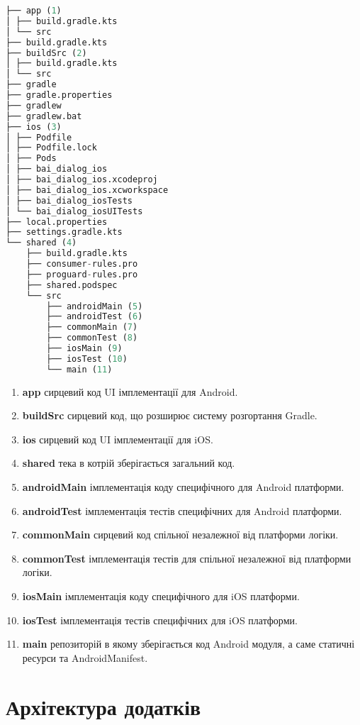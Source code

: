 \begin{lstlisting}[style=light, language=Python,label={lst:kmm_project_layout},caption=KMM Project Layout]
├── app (1)
│ ├── build.gradle.kts
│ └── src
├── build.gradle.kts
├── buildSrc (2)
│ ├── build.gradle.kts
│ └── src
├── gradle
├── gradle.properties
├── gradlew
├── gradlew.bat
├── ios (3)
│ ├── Podfile
│ ├── Podfile.lock
│ ├── Pods
│ ├── bai_dialog_ios
│ ├── bai_dialog_ios.xcodeproj
│ ├── bai_dialog_ios.xcworkspace
│ ├── bai_dialog_iosTests
│ └── bai_dialog_iosUITests
├── local.properties
├── settings.gradle.kts
└── shared (4)
    ├── build.gradle.kts
    ├── consumer-rules.pro
    ├── proguard-rules.pro
    ├── shared.podspec
    └── src
        ├── androidMain (5)
        ├── androidTest (6)
        ├── commonMain (7)
        ├── commonTest (8)
        ├── iosMain (9)
        ├── iosTest (10)
        └── main (11)
\end{lstlisting}

\begin{enumerate}
    \item \textbf{app} сирцевий код UI імплементації для Android.
    \item \textbf{buildSrc} сирцевий код, що розширює систему розгортання Gradle.
    \item \textbf{ios} сирцевий код UI імплементації для iOS.
    \item \textbf{shared} тека в котрій зберігається загальний код.
    \item \textbf{androidMain} імплементація коду специфічного для Android платформи.
    \item \textbf{androidTest} імплементація тестів специфічних для Android платформи.
    \item \textbf{commonMain} сирцевий код спільної незалежної від платформи логіки.
    \item \textbf{commonTest} імплементація тестів для спільної незалежної від платформи логіки.
    \item \textbf{iosMain} імплементація коду специфічного для iOS платформи.
    \item \textbf{iosTest} імплементація тестів специфічних для iOS платформи.
    \item \textbf{main} репозиторій в якому зберігається код Android модуля, а саме статичні ресурси та AndroidManifest.
\end{enumerate}

\section{Архітектура додатків}
\label{sec:general_app_architecture}

